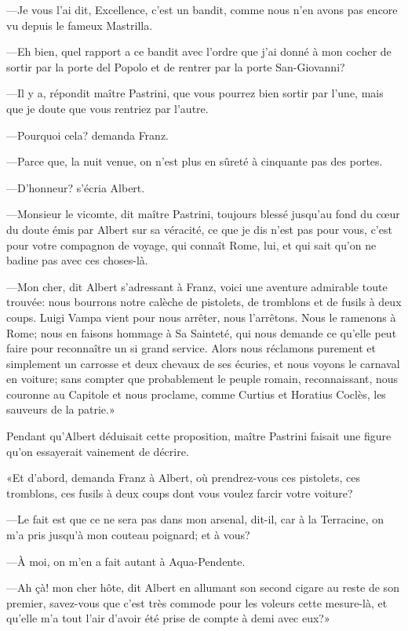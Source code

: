 —Je vous l'ai dit, Excellence, c'est un bandit, comme nous n'en avons pas encore vu depuis le fameux Mastrilla. 

—Eh bien, quel rapport a ce bandit avec l'ordre que j'ai donné à mon cocher de sortir par la porte del Popolo et de rentrer par la porte San-Giovanni? 

—Il y a, répondit maître Pastrini, que vous pourrez bien sortir par l'une, mais que je doute que vous rentriez par l'autre. 

—Pourquoi cela? demanda Franz. 

—Parce que, la nuit venue, on n'est plus en sûreté à cinquante pas des portes. 

—D'honneur? s'écria Albert. 

—Monsieur le vicomte, dit maître Pastrini, toujours blessé jusqu'au fond du cœur du doute émis par Albert sur sa véracité, ce que je dis n'est pas pour vous, c'est pour votre compagnon de voyage, qui connaît Rome, lui, et qui sait qu'on ne badine pas avec ces choses-là. 

—Mon cher, dit Albert s'adressant à Franz, voici une aventure admirable toute trouvée: nous bourrons notre calèche de pistolets, de tromblons et de fusils à deux coups. Luigi Vampa vient pour nous arrêter, nous l'arrêtons. Nous le ramenons à Rome; nous en faisons hommage à Sa Sainteté, qui nous demande ce qu'elle peut faire pour reconnaître un si grand service. Alors nous réclamons purement et simplement un carrosse et deux chevaux de ses écuries, et nous voyons le carnaval en voiture; sans compter que probablement le peuple romain, reconnaissant, nous couronne au Capitole et nous proclame, comme Curtius et Horatius Coclès, les sauveurs de la patrie.» 

Pendant qu'Albert déduisait cette proposition, maître Pastrini faisait une figure qu'on essayerait vainement de décrire. 

«Et d'abord, demanda Franz à Albert, où prendrez-vous ces pistolets, ces tromblons, ces fusils à deux coups dont vous voulez farcir votre voiture? 

—Le fait est que ce ne sera pas dans mon arsenal, dit-il, car à la Terracine, on m'a pris jusqu'à mon couteau poignard; et à vous? 

—À moi, on m'en a fait autant à Aqua-Pendente. 

—Ah çà! mon cher hôte, dit Albert en allumant son second cigare au reste de son premier, savez-vous que c'est très commode pour les voleurs cette mesure-là, et qu'elle m'a tout l'air d'avoir été prise de compte à demi avec eux?» 


